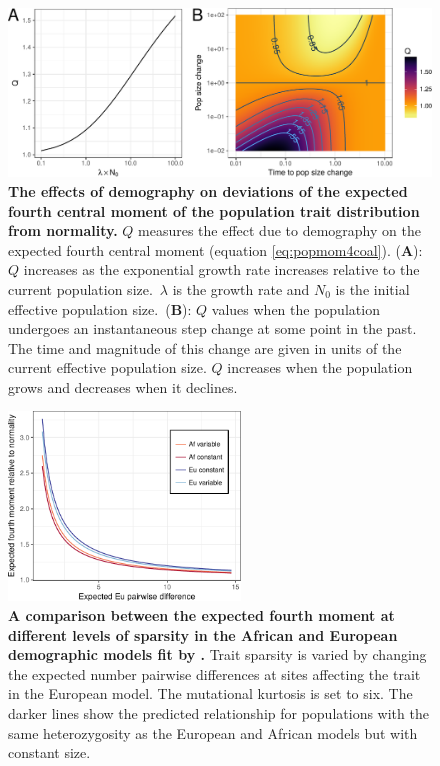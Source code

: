 \begin{figure}
\centering
\includegraphics[width=\textwidth]{./figures/combo_q.pdf}

\caption{
\textbf{The effects of demography on deviations of the expected
fourth central moment of the population trait distribution from normality.} $Q$
measures the effect due to demography on the expected fourth central moment
(equation \eqref{eq:popmom4coal}). (\textbf{A}): $Q$ increases as the
exponential growth rate increases relative to the current population
size.~$\lambda$ is the growth rate and $N_0$ is the initial effective population
size.~(\textbf{B}): $Q$ values when the population undergoes an instantaneous
step change at some point in the past. The time and magnitude of this change are
given in units of the current effective population size. $Q$ increases when the
population grows and decreases when it declines.}

\label{fig:Qexp}
\end{figure}

\begin{figure}
\centering
\includegraphics[width=0.55\textwidth]{./figures/af_eu_mom4_r.pdf}
\caption{ \textbf{A comparison between the expected fourth moment at different levels of
sparsity in the African and European demographic models fit
by \citet{Tennessen2012}.} Trait sparsity is varied by changing the expected
number pairwise differences at sites affecting the trait in the European model.
The mutational kurtosis is set to six. The darker lines show the predicted
relationship for populations with the same heterozygosity as the European and
African models but with constant size.}
\label{fig:afeucomp}
\end{figure}

